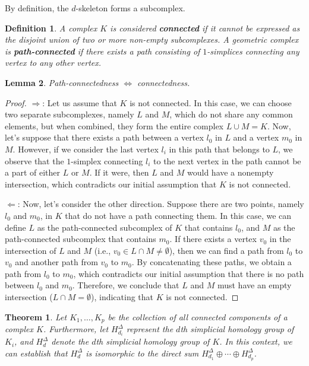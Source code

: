 \documentclass{amsart}
\newtheorem{theorem}[section]{Theorem}
\newtheorem{definition}{Definition}[section]
\newtheorem{lemma}[definition]{Lemma}
\begin{document}
By definition, the $d$-skeleton forms a subcomplex.

\begin{definition}
A complex $K$ is considered \textbf{connected} if it cannot be expressed as the disjoint union of two or more non-empty subcomplexes. A geometric complex is \textbf{path-connected} if there exists a path consisting of $1$-simplices connecting any vertex to any other vertex.
\end{definition}

\begin{lemma}
\label{pathconnect}
Path-connectedness $\Longleftrightarrow$ connectedness.
\end{lemma}

\begin{proof}
\glqq $\Longrightarrow$\grqq{}: Let us assume that $K$ is not connected. In this case, we can choose two separate subcomplexes, namely $L$ and $M$, which do not share any common elements, but when combined, they form the entire complex $L \cup M = K$. Now, let's suppose that there exists a path between a vertex $l_0$ in $L$ and a vertex $m_0$ in $M$. However, if we consider the last vertex $l_i$ in this path that belongs to $L$, we observe that the $1$-simplex connecting $l_i$ to the next vertex in the path cannot be a part of either $L$ or $M$. If it were, then $L$ and $M$ would have a nonempty intersection, which contradicts our initial assumption that $K$ is not connected.

\glqq $\Longleftarrow$\grqq{}: Now, let's consider the other direction. Suppose there are two points, namely $l_0$ and $m_0$, in $K$ that do not have a path connecting them. In this case, we can define $L$ as the path-connected subcomplex of $K$ that contains $l_0$, and $M$ as the path-connected subcomplex that contains $m_0$. If there exists a vertex $v_0$ in the intersection of $L$ and $M$ (i.e., $v_0 \in L \cap M \neq \emptyset$), then we can find a path from $l_0$ to $v_0$ and another path from $v_0$ to $m_0$. By concatenating these paths, we obtain a path from $l_0$ to $m_0$, which contradicts our initial assumption that there is no path between $l_0$ and $m_0$. Therefore, we conclude that $L$ and $M$ must have an empty intersection ($L\cap M= \emptyset$), indicating that $K$ is not connected.
\end{proof}

\begin{theorem}
\label{decomptheorem}
Let $K_1, \ldots, K_p$ be the collection of all connected components of a complex $K$. Furthermore, let $H^\Delta_{d_i}$ represent the $d$th simplicial homology group of $K_i$, and $H^\Delta_d$ denote the $d$th simplicial homology group of $K$. In this context, we can establish that $H^\Delta_d$ is isomorphic to the direct sum $H^\Delta_{d_1} \oplus \cdots \oplus H^\Delta_{d_p}$.
\end{theorem}
\end{document}
